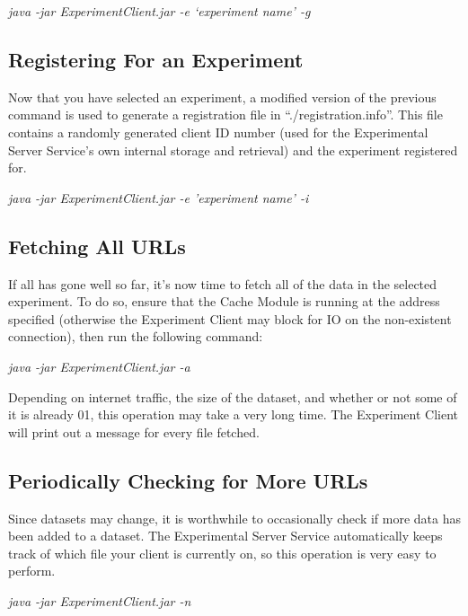 \documentclass[letterpaper]{article}
\begin{document}
\begin{addmargin}[1em]{2em}
\textit{java -jar ExperimentClient.jar -e `experiment name' -g}
\end{addmargin}

\subsection{Registering For an Experiment}
Now that you have selected an experiment, a modified version of the previous command is used to generate a registration file in ``./registration.info''. This file contains a randomly generated client ID number (used for the Experimental Server Service's own internal storage and retrieval) and the experiment registered for. 

\begin{addmargin}[1em]{2em}
\textit{java -jar ExperimentClient.jar -e 'experiment name' -i}
\end{addmargin}

\subsection{Fetching All URLs}
If all has gone well so far, it's now time to fetch all of the data in the selected experiment. To do so, ensure that the Cache Module is running at the address specified (otherwise the Experiment Client may block for IO on the non-existent connection), then run the following command:

\begin{addmargin}[1em]{2em}
\textit{java -jar ExperimentClient.jar -a}
\end{addmargin}

Depending on internet traffic, the size of the dataset, and whether or not some of it is already 01, this operation may take a very long time. The Experiment Client will print out a message for every file fetched.

\subsection{Periodically Checking for More URLs}
Since datasets may change, it is worthwhile to occasionally check if more data has been added to a dataset. The Experimental Server Service automatically keeps track of which file your client is currently on, so this operation is very easy to perform.

\begin{addmargin}[1em]{2em}
\textit{java -jar ExperimentClient.jar -n}
\end{addmargin}
\end{document}
